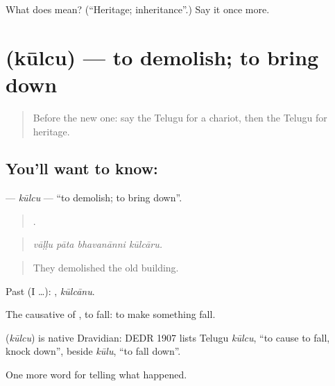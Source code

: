 \begin{tcolorbox}[breakable,colback=teal!4,colframe=teal!35!black,title={Before you move on}]
What does  mean? (\textquotedblleft{}Heritage; inheritance\textquotedblright{}.) Say it once more.
\end{tcolorbox}
\section[\texorpdfstring{\te{కూల్చు} (kūlcu)}{కూల్చు (kūlcu)}]{ (kūlcu) — to demolish; to bring down}

\label{lesson:TE-C369-kulcu}



\begin{quote}
Before the new one: say the Telugu for a chariot, then the Telugu for heritage.
\end{quote}

\subsection*{You'll want to know: }
\textbf{} — \emph{kūlcu} — \textquotedblleft{}to demolish; to bring down\textquotedblright{}.

\begin{quote}
   .
\end{quote}

\begin{quote}
\emph{vāḷḷu pāta bhavanānni kūlcāru.}
\end{quote}

\begin{quote}
They demolished the old building.
\end{quote}

Past (I …): , \emph{kūlcānu}.

The causative of , to fall: to make something fall.

\begin{cousinweb}
\textbf{} (\emph{kūlcu}) is native Dravidian: DEDR 1907 lists Telugu \emph{kūlcu}, \textquotedblleft{}to cause to fall, knock down\textquotedblright{}, beside \emph{kūlu}, \textquotedblleft{}to fall down\textquotedblright{}.
\end{cousinweb}

\begin{grammarlens}[title={What you've built}]
One more word for telling what happened.
\end{grammarlens}

